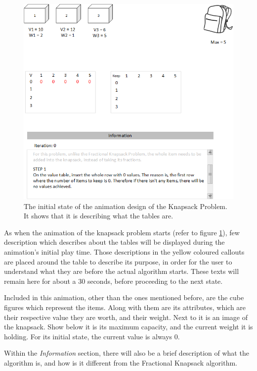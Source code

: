 \begin{figure}[H]
\centering
\includegraphics[scale=0.7]{images/report_images/animationDesignKnapsackProblem_STEP2.png}
\caption{The initial state of the animation design of the Knapsack Problem. It shows that it is describing what the tables are.}
\label{animationDesignKnapsackProblem}
\end{figure}

As when the animation of the knapsack problem starts (refer to figure \ref{animationDesignKnapsackProblem}), few description which describes about the tables will be displayed during the animation's initial play time. Those descriptions in the yellow coloured callouts are placed around the table to describe its purpose, in order for the user to understand what they are before the actual algorithm starts. These texts will remain here for about a 30 seconds, before proceeding to the next state.

Included in this animation, other than the ones mentioned before, are the cube figures which represent the items. Along with them are its attributes, which are their respective value they are worth, and their weight. Next to it is an image of the knapsack. Show below it is its maximum capacity, and the current weight it is holding. For its initial state, the current value is always 0.

Within the \textit{Information} section, there will also be a brief description of what the algorithm is, and how is it different from the Fractional Knapsack algorithm. 

